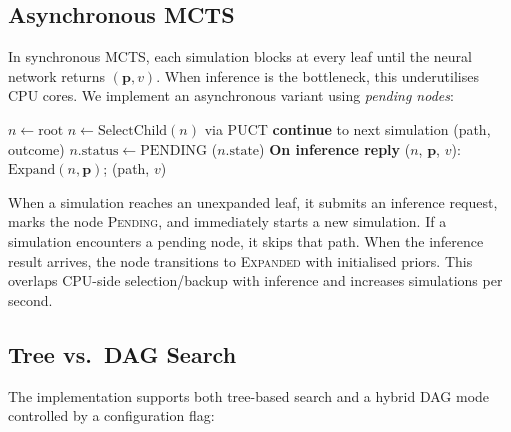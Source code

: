 \documentclass[11pt]{article}
\begin{document}
\subsection{Asynchronous MCTS}
\label{sec:async}

In synchronous MCTS, each simulation blocks at every leaf until the
neural network returns $(\mathbf{p}, v)$. When inference is the
bottleneck, this underutilises CPU cores. We implement an asynchronous
variant using \emph{pending nodes}:

\begin{algorithm}[t]
\caption{Asynchronous MCTS root search (conceptual)}
\label{alg:async}
\begin{algorithmic}[1]
  \STATE $n \gets \text{root}$
    \STATE $n \gets \text{SelectChild}(n)$ via PUCT
      \STATE \textbf{continue} to next simulation
    \ENDIF
  \ENDWHILE
    \STATE {}(path, outcome)
  \ELSE
    \STATE $n.\text{status} \gets \text{PENDING}$
    \STATE {}($n.\text{state}$)
  \ENDIF
\ENDFOR
\STATE \textbf{On inference reply} ($n$, $\mathbf{p}$, $v$):
\STATE \quad $\text{Expand}(n, \mathbf{p})$; (path, $v$)
\end{algorithmic}
\end{algorithm}

When a simulation reaches an unexpanded leaf, it submits an inference
request, marks the node \textsc{Pending}, and immediately starts a new
simulation. If a simulation encounters a pending node, it skips that path.
When the inference result arrives, the node transitions to
\textsc{Expanded} with initialised priors. This overlaps CPU-side
selection/backup with inference and increases simulations per second.

\subsection{Tree vs.\ DAG Search}
\label{sec:dag}

The implementation supports both tree-based search and a hybrid DAG mode
controlled by a configuration flag:
\end{document}
